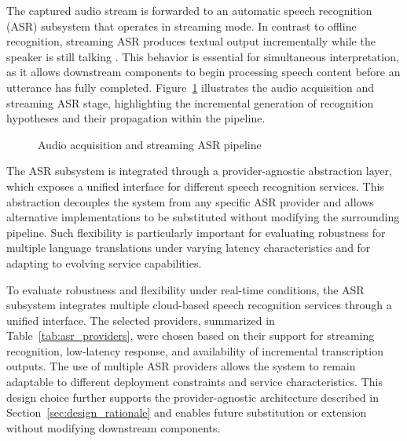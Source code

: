The captured audio stream is forwarded to an automatic speech recognition (ASR) subsystem that operates in streaming mode. In contrast to offline recognition, streaming ASR produces textual output incrementally while the speaker is still talking \cite{weller2021streamingST}. This behavior is essential for simultaneous interpretation, as it allows downstream components to begin processing speech content before an utterance has fully completed. Figure~\ref{fig:asr_flow} illustrates the audio acquisition and streaming ASR stage, highlighting the incremental generation of recognition hypotheses and their propagation within the pipeline.

\begin{figure}[!htbp]
  \centering
  
  \caption[Audio acquisition and streaming ASR pipeline]{Audio acquisition and streaming ASR pipeline}
  \label{fig:asr_flow}
\end{figure}

The ASR subsystem is integrated through a provider-agnostic abstraction layer, which exposes a unified interface for different speech recognition services. This abstraction decouples the system from any specific ASR provider and allows alternative implementations to be substituted without modifying the surrounding pipeline. Such flexibility is particularly important for evaluating robustness for multiple language translations under varying latency characteristics and for adapting to evolving service capabilities.

To evaluate robustness and flexibility under real-time conditions, the ASR subsystem integrates multiple cloud-based speech recognition services through a unified interface. The selected providers, summarized in Table~\ref{tab:asr_providers}, were chosen based on their support for streaming recognition, low-latency response, and availability of incremental transcription outputs. The use of multiple ASR providers allows the system to remain adaptable to different deployment constraints and service characteristics. This design choice further supports the provider-agnostic architecture described in Section~\ref{sec:design_rationale} and enables future substitution or extension without modifying downstream components.


